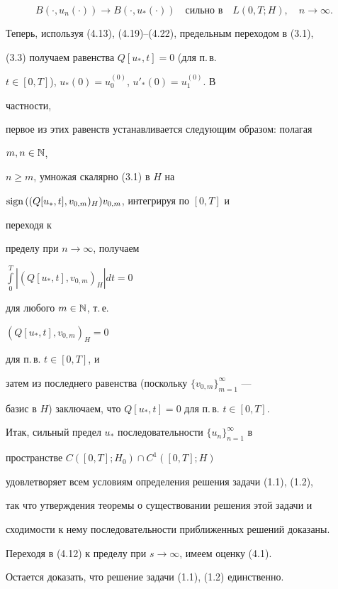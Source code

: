 \begin{pf}
\begin{equation}
B(\cdot,u_n(\cdot))\to B(\cdot,u_*(\cdot))\quad 


\text{сильно в}\quad 


L(0,T;H),\quad n\to\infty. 


\end{equation} 


Теперь, используя (4.13), (4.19)--(4.22), предельным переходом в (3.1), 


(3.3) получаем равенства $Q[u_*,t]=0$ (для п.\,в.{} 


$t\in[0,T]$), $u_*(0)=u^{(0)}_0$, $u'_*(0)=u^{(0)}_1$. В 


частности, 


первое из этих равенств устанавливается следующим образом: полагая 


$m,n\in\Bbb N$, 


$n\ge m$, умножая скалярно (3.1) в $H$ на 


$\text{sign\,}((Q[u_*,t],v_{0,m})_H)v_{0,m}$, интегрируя по $[0,T]$ и 


переходя к 


пределу при $n\to\infty$, получаем 


$\int\limits^T_0|(Q[u_*,t],v_{0,m})_H|dt=0$ 


для любого $m\in\Bbb N$, т.\,е.{} 


$(Q[u_*,t],v_{0,m})_H=0$ 


для п.\,в.{} $t\in[0,T]$, и 


затем из последнего равенства (поскольку $\{v_{0,m}\}^\infty_{m=1}$ --- 


базис в $H$) заключаем, что $Q[u_*,t]=0$ для п.\,в.{} $t\in[0,T]$. 


 


Итак, сильный предел $u_*$ последовательности $\{u_n\}^\infty_{n=1}$ в 


пространстве $C([0,T];H_0)\cap C^1([0,T];H)$ 


удовлетворяет всем условиям определения решения задачи (1.1), (1.2), 


так что утверждения теоремы о существовании решения этой задачи и 


сходимости к нему последовательности приближенных решений доказаны. 


Переходя в (4.12) к пределу при $s\to\infty$, имеем оценку (4.1). 


 


Остается доказать, что решение задачи (1.1), (1.2) единственно. 



\end{pf}

